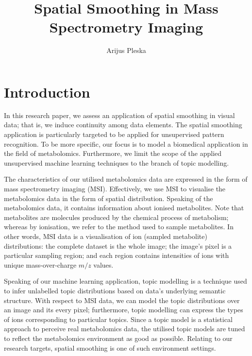 \documentclass{mpaper}
\begin{document}
\title{Spatial Smoothing in Mass Spectrometry Imaging}
\author{Arijus Pleska}

\begin{abstract}
\lipsum[1]
\end{abstract}

\section{Introduction}

\par In this research paper, we assess an application of spatial smoothing in visual data; that is, we induce continuity among data elements. The spatial smoothing application is particularly targeted to be applied for unsupervised pattern recognition. To be more specific, our focus is to model a biomedical application in the field of metabolomics. Furthermore, we limit the scope of the applied unsupervised machine learning techniques to the branch of topic modelling.  

\par The characteristics of our utilised metabolomics data are expressed in the form of mass spectrometry imaging (MSI). Effectively, we use MSI to visualise the metabolomics data in the form of spatial distribution. Speaking of the metabolomics data, it contains information about ionised metabolites. Note that metabolites are molecules produced by the chemical process of metabolism; whereas by ionisation, we refer to the method used to sample metabolites. In other words, MSI data is a visualisation of ion (sampled metabolite) distributions: the complete dataset is the whole image; the image's pixel is a particular sampling region; and each region contains intensities of ions with unique mass-over-charge $m/z$ values. 

\par Speaking of our machine learning application, topic modelling is a technique used to infer unlabelled topic distributions based on data's underlying semantic structure. With respect to MSI data, we can model the topic distributions over an image and its every pixel; furthermore, topic modelling can express the types of ions corresponding to particular topics. Since a topic model is a statistical approach to perceive real metabolomics data, the utilised topic models are tuned to reflect the metabolomics environment as good as possible. Relating to our research targets, spatial smoothing is one of such environment settings.
\end{document}

